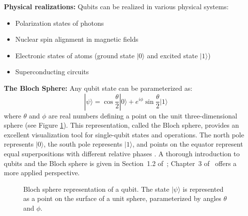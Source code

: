 \documentclass[a4paper,12pt]{amsart}
\begin{document}
\textbf{Physical realizations:} Qubits can be realized in various physical systems:
\begin{itemize}
    \item Polarization states of photons
    \item Nuclear spin alignment in magnetic fields
    \item Electronic states of atoms (ground state $|0\rangle$ and excited state $|1\rangle$)
    \item Superconducting circuits
\end{itemize}

\textbf{The Bloch Sphere:} Any qubit state can be parameterized as:
\begin{equation}
|\psi\rangle = \cos\frac{\theta}{2}|0\rangle + e^{i\phi}\sin\frac{\theta}{2}|1\rangle
\end{equation}
where $\theta$ and $\phi$ are real numbers defining a point on the unit three-dimensional sphere (see Figure \ref{fig:bloch}). This representation, called the Bloch sphere, provides an excellent visualization tool for single-qubit states and operations. The north pole represents $|0\rangle$, the south pole represents $|1\rangle$, and points on the equator represent equal superpositions with different relative phases \cite{nielsen2011quantum, hidary2021quantum}. A thorough introduction to qubits and the Bloch sphere is given in Section~1.2 of~\cite{nielsen2011quantum}; Chapter~3 of~\cite{hidary2021quantum} offers a more applied perspective.


\begin{figure}[h]
\centering
{}
\caption{Bloch sphere representation of a qubit. The state $|\psi\rangle$ is represented as a point on the surface of a unit sphere, parameterized by angles $\theta$ and $\phi$.}
\label{fig:bloch}
\end{figure}
\end{document}
